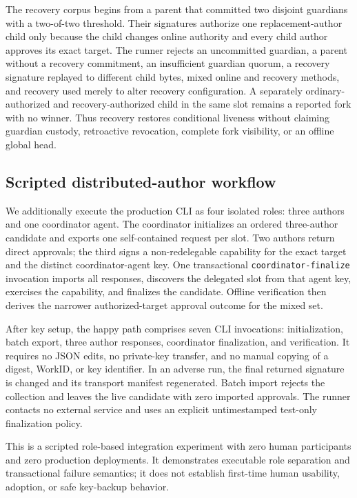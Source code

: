 \documentclass[conference,compsoc]{IEEEtran}
\begin{document}
The recovery corpus begins from a parent that committed two disjoint guardians
with a two-of-two threshold. Their signatures authorize one replacement-author
child only because the child changes online authority and every child author
approves its exact target. The runner rejects an uncommitted guardian, a parent
without a recovery commitment, an insufficient guardian quorum, a recovery
signature replayed to different child bytes, mixed online and recovery methods,
and recovery used merely to alter recovery configuration. A separately ordinary-
authorized and recovery-authorized child in the same slot remains a reported
fork with no winner. Thus recovery restores conditional liveness without
claiming guardian custody, retroactive revocation, complete fork visibility, or
an offline global head.

\subsection{Scripted distributed-author workflow}

We additionally execute the production CLI as four isolated roles: three
authors and one coordinator agent. The coordinator initializes an ordered
three-author candidate and exports one self-contained request per slot. Two
authors return direct approvals; the third signs a non-redelegable capability
for the exact target and the distinct coordinator-agent key. One transactional
\texttt{coordinator-finalize} invocation imports all responses, discovers the
delegated slot from that agent key, exercises the capability, and finalizes the
candidate. Offline verification then derives the narrower authorized-target
approval outcome for the mixed set.

After key setup, the happy path comprises seven CLI invocations: initialization,
batch export, three author responses, coordinator finalization, and
verification. It requires no JSON edits, no private-key transfer, and no manual
copying of a digest, WorkID, or key identifier. In an adverse run, the final
returned signature is changed and its transport manifest regenerated. Batch
import rejects the collection and leaves the live candidate with zero imported
approvals. The runner contacts no external service and uses an explicit
untimestamped test-only finalization policy.

This is a scripted role-based integration experiment with zero human
participants and zero production deployments. It demonstrates executable role
separation and transactional failure semantics; it does not establish first-time
human usability, adoption, or safe key-backup behavior.
\end{document}
